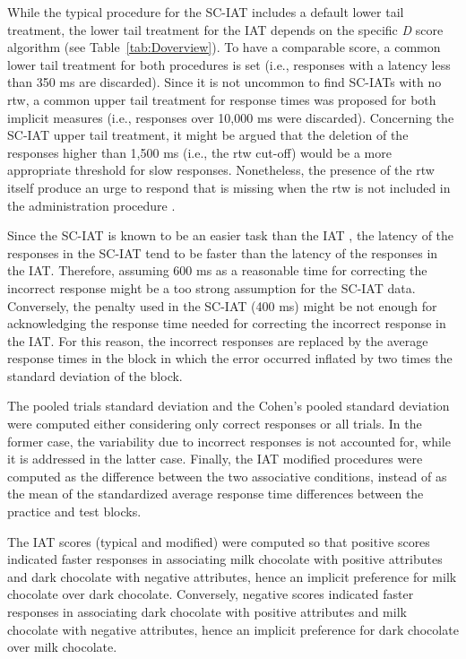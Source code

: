 \documentclass[12pt]{book}
\begin{document}
While the typical procedure for the SC-IAT includes a default lower tail treatment, the lower tail treatment for the IAT depends on the specific \emph{D} score algorithm (see Table~\ref{tab:Doverview}). To have a comparable score, a common lower tail treatment for both procedures is set (i.e., responses with a latency less than 350 ms are discarded). 
Since it is not uncommon to find SC-IATs with no rtw, a common upper tail treatment for response times was proposed for both implicit measures (i.e., responses over 10,000 ms were discarded). Concerning the SC-IAT upper tail treatment, it might be argued that the deletion of the responses higher than 1,500 ms (i.e., the rtw cut-off) would be a more appropriate threshold for slow responses. Nonetheless, the presence of the rtw itself produce an urge to respond that is missing when the rtw is not included in the administration procedure \cite{karpinski2006}. 

Since the SC-IAT is known to be an easier task than the IAT \cite{karpinski2006}, the latency of the responses in the SC-IAT tend to be faster than the latency of the responses in the IAT. Therefore, assuming 600 ms as a reasonable time for correcting the incorrect response might be a too strong assumption for the SC-IAT data. Conversely, the penalty used in the SC-IAT (400 ms) might be not enough for acknowledging the response time needed for correcting the incorrect response in the IAT. For this reason, the incorrect responses are replaced by the average response times in the block in which the error occurred inflated by two times the standard deviation of the block.  

The pooled trials standard deviation and the Cohen’s pooled standard deviation were computed either considering only correct responses or all trials. In the former case, the variability due to incorrect responses is not accounted for, while it is addressed in the latter case.
Finally, the IAT modified procedures were computed as the difference between the two associative conditions, instead of as the mean of the standardized average response time differences between the practice and test blocks.

The IAT scores (typical and modified) were computed so that positive scores indicated faster responses in associating milk chocolate with positive attributes and dark chocolate with negative attributes, hence an implicit preference for milk chocolate over dark chocolate. Conversely, negative scores indicated faster responses in associating dark chocolate with positive attributes and milk chocolate with negative attributes, hence an implicit preference for dark chocolate over milk chocolate. 
\end{document}
